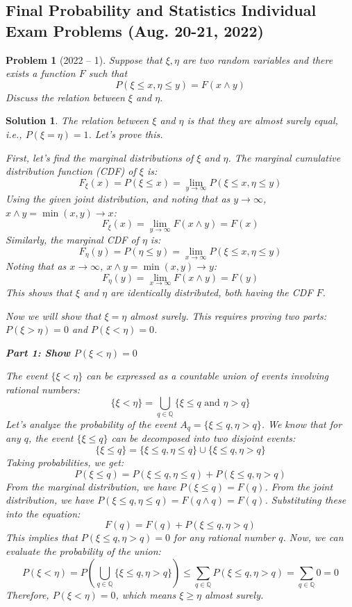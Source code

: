 \documentclass[12pt]{amsart}
\newtheorem{problem}{Problem}
\newtheorem*{solution}{Solution}
\begin{document}
\subsection*{Final Probability and Statistics Individual Exam Problems (Aug. 20-21, 2022)}

\begin{problem}[2022 -- 1]
Suppose that $\xi, \eta$ are two random variables and there exists a function $F$ such that
$$
P(\xi \leq x, \eta \leq y)=F(x \wedge y)
$$
Discuss the relation between $\xi$ and $\eta$.
\end{problem}

\begin{solution}
    The relation between $\xi$ and $\eta$ is that they are almost surely equal, i.e., $P(\xi = \eta) = 1$. Let's prove this.
    
    First, let's find the marginal distributions of $\xi$ and $\eta$.
    The marginal cumulative distribution function (CDF) of $\xi$ is:
    $$ F_{\xi}(x) = P(\xi \leq x) = \lim_{y \to \infty} P(\xi \leq x, \eta \leq y) $$
    Using the given joint distribution, and noting that as $y \to \infty$, $x \wedge y = \min(x,y) \to x$:
    $$ F_{\xi}(x) = \lim_{y \to \infty} F(x \wedge y) = F(x) $$
    Similarly, the marginal CDF of $\eta$ is:
    $$ F_{\eta}(y) = P(\eta \leq y) = \lim_{x \to \infty} P(\xi \leq x, \eta \leq y) $$
    Noting that as $x \to \infty$, $x \wedge y = \min(x,y) \to y$:
    $$ F_{\eta}(y) = \lim_{x \to \infty} F(x \wedge y) = F(y) $$
    This shows that $\xi$ and $\eta$ are identically distributed, both having the CDF $F$.
    
    Now we will show that $\xi = \eta$ almost surely. This requires proving two parts: $P(\xi > \eta) = 0$ and $P(\xi < \eta) = 0$.
    
    \textbf{Part 1: Show $P(\xi < \eta) = 0$}
    
    The event $\{\xi < \eta\}$ can be expressed as a countable union of events involving rational numbers:
    $$ \{\xi < \eta\} = \bigcup_{q \in \mathbb{Q}} \{\xi \le q \text{ and } \eta > q\} $$
    Let's analyze the probability of the event $A_q = \{\xi \le q, \eta > q\}$.
    We know that for any $q$, the event $\{\xi \le q\}$ can be decomposed into two disjoint events:
    $$ \{\xi \le q\} = \{\xi \le q, \eta \le q\} \cup \{\xi \le q, \eta > q\} $$
    Taking probabilities, we get:
    $$ P(\xi \le q) = P(\xi \le q, \eta \le q) + P(\xi \le q, \eta > q) $$
    From the marginal distribution, we have $P(\xi \le q) = F(q)$.
    From the joint distribution, we have $P(\xi \le q, \eta \le q) = F(q \wedge q) = F(q)$.
    Substituting these into the equation:
    $$ F(q) = F(q) + P(\xi \le q, \eta > q) $$
    This implies that $P(\xi \le q, \eta > q) = 0$ for any rational number $q$.
    Now, we can evaluate the probability of the union:
    $$ P(\xi < \eta) = P\left(\bigcup_{q \in \mathbb{Q}} \{\xi \le q, \eta > q\}\right) \le \sum_{q \in \mathbb{Q}} P(\xi \le q, \eta > q) = \sum_{q \in \mathbb{Q}} 0 = 0 $$
    Therefore, $P(\xi < \eta) = 0$, which means $\xi \ge \eta$ almost surely.
    

\end{solution}
\end{document}
